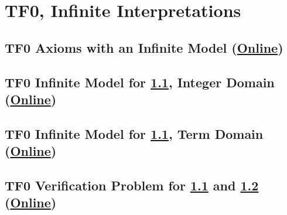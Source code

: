 \documentclass{easychair}
\begin{document}
\begin{minipage}{\textwidth}
\section{TF0, Infinite Interpretations}
\label{TF0Infinite}

\subsection{TF0 Axioms with an Infinite Model
(\href{https://raw.githubusercontent.com/GeoffsPapers/InterpretationFormat/master/Examples/TFF_Infinite.p}{Online})}
\label{TFF_Infinite.p}
\begin{small}

\end{small}
\end{minipage}

\begin{minipage}{\textwidth}
\subsection{TF0 Infinite Model for \ref{TFF_Infinite.p}, Integer Domain
(\href{https://raw.githubusercontent.com/GeoffsPapers/InterpretationFormat/master/Examples/TFF_Integer.s}{Online})}
\label{TFF_Integer.s}
\begin{small}

\end{small}
\end{minipage}

\begin{minipage}{\textwidth}
\subsection{TF0 Infinite Model for \ref{TFF_Infinite.p}, Term Domain
(\href{https://raw.githubusercontent.com/GeoffsPapers/InterpretationFormat/master/Examples/TFF_Peano.s}{Online})}
\label{TFF_Peano.s}
\begin{small}

\end{small}
\end{minipage}

\begin{minipage}{\textwidth}
\subsection{TF0 Verification Problem for \ref{TFF_Infinite.p} and \ref{TFF_Integer.s}
(\href{https://raw.githubusercontent.com/GeoffsPapers/InterpretationFormat/master/Examples/TFF_Integer.s.p}{Online})}
\label{TFF_Integer.s.p}
\begin{small}

\end{small}
\end{minipage}
\end{document}
